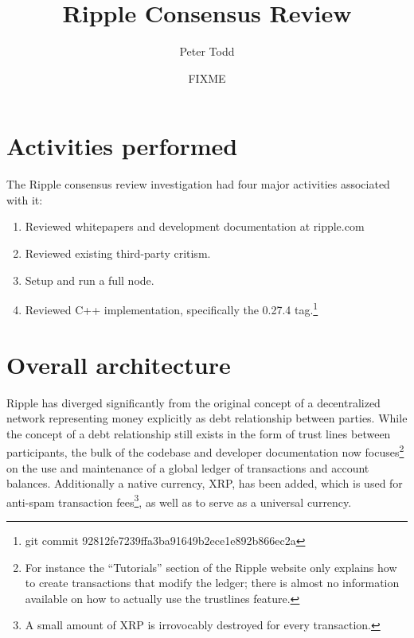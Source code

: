 \documentclass{article}
\begin{document}
\title{Ripple Consensus Review}
\author{Peter Todd}
\date{FIXME}
\maketitle

\section{Activities performed}

The Ripple consensus review investigation had four major activities associated
with it:

\begin{enumerate}

    \item Reviewed whitepapers and development documentation at ripple.com

    \item Reviewed existing third-party critism.

    \item Setup and run a full node.

    \item Reviewed C++ implementation, specifically the 0.27.4 tag.\footnote{git commit 92812fe7239ffa3ba91649b2ece1e892b866ec2a}

\end{enumerate}


\section{Overall architecture}

Ripple has diverged significantly from the original concept of a decentralized
network representing money explicitly as debt relationship between
parties.\cite{btcmag-introducing-ripple} While the concept of a debt
relationship still exists in the form of trust lines between participants, the
bulk of the codebase and developer documentation now focuses\footnote{For
    instance the ``Tutorials'' section of the Ripple website only explains how
    to create transactions that modify the ledger; there is almost no information
available on how to actually use the trustlines feature.} on the use and
maintenance of a global ledger of transactions and account balances.
Additionally a native currency, XRP, has been added, which is used for
anti-spam transaction fees\footnote{A small amount of XRP is irrovocably
destroyed for every transaction.}, as well as to serve as a universal currency.
\end{document}
